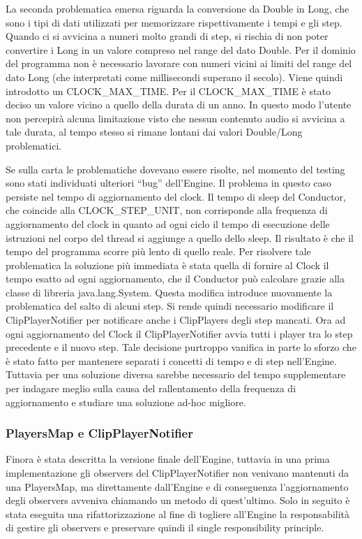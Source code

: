 \documentclass[a4paper,12pt]{report}
\begin{document}
La seconda problematica emersa riguarda la conversione da Double in Long, che sono i tipi di dati utilizzati per memorizzare rispettivamente i tempi e gli step.
Quando ci si avvicina a numeri molto grandi di step, si rischia di non poter convertire i Long in un valore compreso nel range del dato Double. Per il dominio del programma non è necessario lavorare con numeri vicini ai limiti del range del dato Long (che interpretati come millisecondi superano il secolo). Viene quindi introdotto un CLOCK\_MAX\_TIME. 
Per il CLOCK\_MAX\_TIME è stato deciso un valore vicino a quello della durata di un anno. In questo modo l’utente non percepirà alcuna limitazione visto che nessun contenuto audio si avvicina a tale durata, al tempo stesso si rimane lontani dai valori Double/Long problematici.

Se sulla carta le problematiche dovevano essere risolte, nel momento del testing sono stati individuati ulteriori “bug” dell’Engine.
Il problema in questo caso persiste nel tempo di aggiornamento del clock. 
Il tempo di sleep del Conductor, che coincide alla CLOCK\_STEP\_UNIT, non corrisponde alla frequenza di aggiornamento del clock in quanto ad ogni ciclo il tempo di esecuzione delle istruzioni nel corpo del thread si aggiunge a quello dello sleep. Il risultato è che il tempo del programma scorre più lento di quello reale.
Per risolvere tale problematica la soluzione più immediata è stata quella di fornire al Clock il tempo esatto ad ogni aggiornamento, che il Conductor può calcolare grazie alla classe di libreria java.lang.System.
Questa modifica introduce nuovamente la problematica del salto di alcuni step. Si rende quindi necessario modificare il ClipPlayerNotifier per notificare anche i ClipPlayers degli step mancati. Ora ad ogni aggiornamento del Clock il ClipPlayerNotifier avvia tutti i player tra lo step precedente e il nuovo step.
Tale decisione purtroppo vanifica in parte lo sforzo che è stato fatto per mantenere separati i concetti di tempo e di step nell’Engine. Tuttavia per una soluzione diversa sarebbe necessario del tempo supplementare per indagare meglio sulla causa del rallentamento della frequenza di aggiornamento e studiare una soluzione ad-hoc migliore.

\subsubsection{PlayersMap e ClipPlayerNotifier}
Finora è stata descritta la versione finale dell’Engine, tuttavia in una prima implementazione gli observers del ClipPlayerNotifier non venivano mantenuti da una PlayersMap, ma direttamente dall’Engine e di conseguenza l’aggiornamento degli observers avveniva chiamando un metodo di quest'ultimo. 
Solo in seguito è stata eseguita una rifattorizzazione al fine di togliere all’Engine la responsabilità di gestire gli observers e preservare quindi il single responsibility principle.
\end{document}
